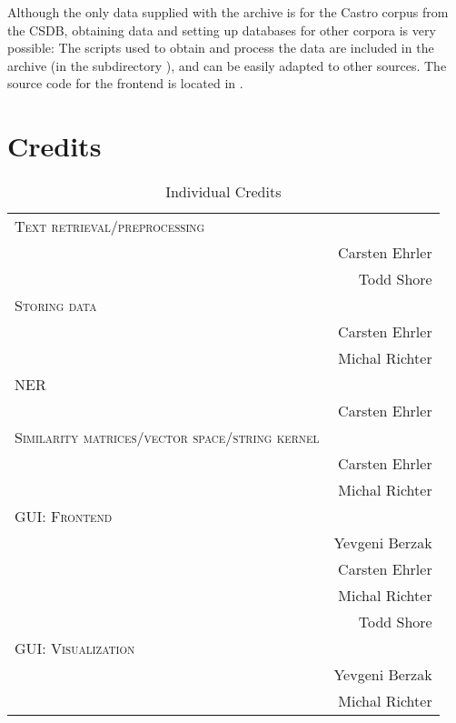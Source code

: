 Although the only data supplied with the archive is for the Castro corpus from the CSDB, obtaining data and setting up databases for other corpora is very possible: The scripts used to obtain and process the data are included in the archive (in the subdirectory ), and can be easily adapted to other sources. The source code for the frontend is located in .

\section{Credits}
\begin{table}[h]
\centering
\caption{Individual Credits}
\begin{tabular}{l r}
\toprule
  	\textsc{Text retrieval/preprocessing} &  \\
  		& Carsten Ehrler \\
 		& Todd Shore \\
  	\textsc{Storing data} & \\
  		& Carsten Ehrler \\ 
  		& Michal Richter \\
	\textsc{NER} & \\
		& Carsten Ehrler \\
	\textsc{Similarity matrices/vector space/string kernel} & \\
		& Carsten Ehrler \\
		& Michal Richter \\
	\textsc{GUI: Frontend} & \\
		& Yevgeni Berzak \\
  		& Carsten Ehrler \\
		& Michal Richter \\
		& Todd Shore \\
	\textsc{GUI: Visualization} & \\
		& Yevgeni Berzak \\
		& Michal Richter \\
  \bottomrule
\end{tabular}
\end{table}
